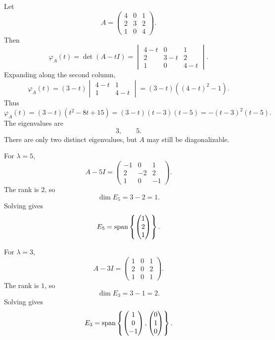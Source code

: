 \documentclass[11pt,openany]{article}
\begin{document}
\begin{example}
Let
\[
A=\begin{pmatrix}
	4&0&1\\
	2&3&2\\
	1&0&4
\end{pmatrix}.
\]
Then
\[
\varphi_A(t)=\det(A-tI)
=\begin{vmatrix}
	4-t&0&1\\
	2&3-t&2\\
	1&0&4-t
\end{vmatrix}.
\]
Expanding along the second column,
\[
\varphi_A(t)
=(3-t)\begin{vmatrix}4-t&1\\1&4-t\end{vmatrix}
=(3-t)((4-t)^2-1).
\]
Thus
\[
\varphi_A(t)=(3-t)(t^2-8t+15)
=(3-t)(t-3)(t-5)
=-(t-3)^2(t-5).
\]
The eigenvalues are
\[
3,
\qquad
5.
\]
There are only two distinct eigenvalues, but $A$ may still be diagonalizable.

For $\lambda=5$,
\[
A-5I=
\begin{pmatrix}
	-1&0&1\\
	2&-2&2\\
	1&0&-1
\end{pmatrix}.
\]
The rank is $2$, so
\[
\dim E_5=3-2=1.
\]
Solving gives
\[
E_5=\operatorname{\normalfont span}\left\{
\begin{pmatrix}1\\2\\1\end{pmatrix}
\right\}.
\]

For $\lambda=3$,
\[
A-3I=
\begin{pmatrix}
	1&0&1\\
	2&0&2\\
	1&0&1
\end{pmatrix}.
\]
The rank is $1$, so
\[
\dim E_3=3-1=2.
\]
Solving gives
\[
E_3=\operatorname{\normalfont span}\left\{
\begin{pmatrix}1\\0\\-1\end{pmatrix},
\begin{pmatrix}0\\1\\0\end{pmatrix}
\right\}.
\]


\end{example}
\end{document}
